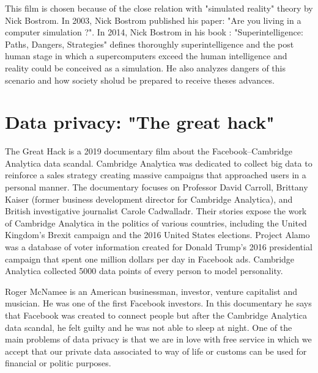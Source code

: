  This film is chosen because of the close relation with  "simulated reality" theory by Nick Bostrom.
 In 2003, Nick Bostrom published his paper: "Are you living in a computer simulation ?".
 In 2014, Nick Bostrom in his book : "Superintelligence: Paths, Dangers, Strategies" 
 defines thoroughly superintelligence and the post human stage in which a supercomputers exceed the human intelligence and reality could be 
 conceived as a simulation. He also analyzes dangers of this scenario and 
 how society sholud be prepared to receive theses advances. 
 
 
 
   
    
  
   
\section*{Data privacy: "The great hack"}
 The Great Hack is a 2019 documentary film about the Facebook–Cambridge Analytica data scandal.
 Cambridge Analytica was dedicated to collect big data to reinforce a  sales strategy creating massive campaigns that approached users in a 
 personal manner.
 The documentary focuses on Professor David Carroll, Brittany Kaiser (former business development director for Cambridge Analytica), and 
 British investigative journalist Carole Cadwalladr. Their stories expose the work of Cambridge Analytica in the politics of various 
 countries, including the United Kingdom's Brexit campaign and the 2016 United States elections.   
 Project Alamo was a database of voter information created for Donald Trump's 2016 presidential campaign
 that spent one million dollars per day in Facebook ads. 
 Cambridge Analytica collected 5000 data points of every person to model personality.   
  
 Roger McNamee is an American businessman, investor, venture capitalist and musician.
 He was one of the first Facebook investors. In this documentary he says that 
 Facebook was created to connect people but after the Cambridge Analytica data scandal, he felt guilty and 
 he was not able to sleep at night. 
 One of the main problems of data privacy is that we are in love with free service in which   we accept 
 that our private data associated to way of life or customs can be used for financial or politic purposes. 
 
